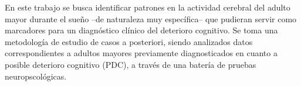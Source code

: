\documentclass[12pt,a4paper]{mitthesis}
\begin{document}

En este trabajo se busca identificar patrones en la actividad cerebral del adulto
mayor durante el sue\~no
--de naturaleza muy espec\'ifica-- 
que pudieran servir como marcadores para un diagn\'ostico cl\'inico del deterioro cognitivo.
Se toma una metodolog\'ia de estudio de casos a posteriori, siendo analizados datos 
correspondientes a adultos mayores previamente diagnosticados en cuanto a 
posible deterioro cognitivo (PDC), a trav\'es de una bater\'ia de pruebas neuropscol\'ogicas.

\end{document}
